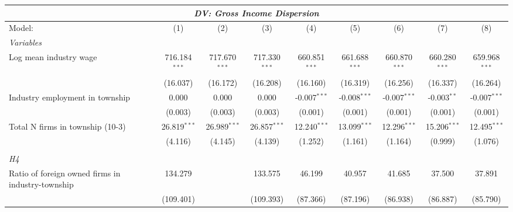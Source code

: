 \begingroup
\centering
\begin{tabular}{lcccccccc}
   \tabularnewline \multicolumn{9}{c}{\textit{DV: Gross Income Dispersion}} \\ \midrule \midrule
   Model:                                                & (1)             & (2)             & (3)             & (4)              & (5)              & (6)              & (7)              & (8)\\  
   \midrule
   \emph{Variables}\\
   Log mean industry wage                                & 716.184$^{***}$ & 717.670$^{***}$ & 717.330$^{***}$ & 660.851$^{***}$  & 661.688$^{***}$  & 660.870$^{***}$  & 660.280$^{***}$  & 659.968$^{***}$\\   
                                                         & (16.037)        & (16.172)        & (16.208)        & (16.160)         & (16.319)         & (16.256)         & (16.337)         & (16.264)\\   
   Industry employment in township                       & 0.000           & 0.000           & 0.000           & -0.007$^{***}$   & -0.008$^{***}$   & -0.007$^{***}$   & -0.003$^{**}$    & -0.007$^{***}$\\   
                                                         & (0.003)         & (0.003)         & (0.003)         & (0.001)          & (0.001)          & (0.001)          & (0.001)          & (0.001)\\   
   Total N firms in township (10-3)                      & 26.819$^{***}$  & 26.989$^{***}$  & 26.857$^{***}$  & 12.240$^{***}$   & 13.099$^{***}$   & 12.296$^{***}$   & 15.206$^{***}$   & 12.495$^{***}$\\   
                                                         & (4.116)         & (4.145)         & (4.139)         & (1.252)          & (1.161)          & (1.164)          & (0.999)          & (1.076)\\   
\hdashline %
\\[0.1ex] %
\emph{H4} \\ 
   Ratio of foreign owned firms in industry-township     & 134.279         &                 & 133.575         & 46.199           & 40.957           & 41.685           & 37.500           & 37.891\\   
                                                         & (109.401)       &                 & (109.393)       & (87.366)         & (87.196)         & (86.938)         & (86.887)         & (85.790)\\   

\end{tabular}
